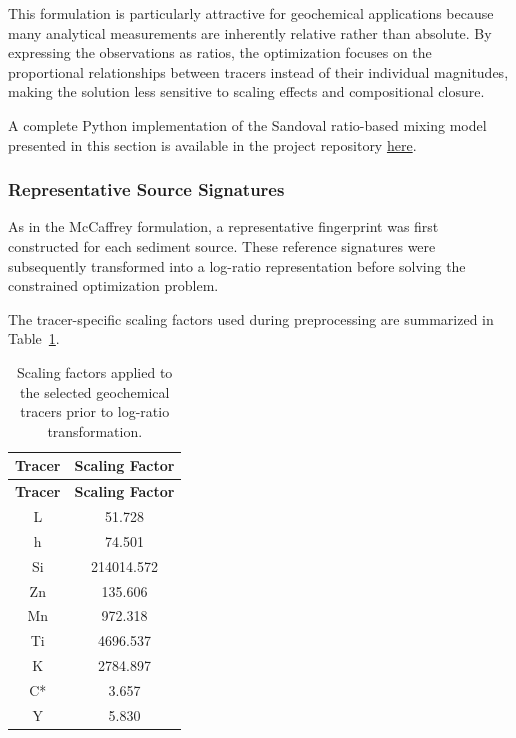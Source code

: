 \documentclass[
  12pt,
  letterpaper,
]{book}
\begin{document}
This formulation is particularly attractive for geochemical applications
because many analytical measurements are inherently relative rather than
absolute. By expressing the observations as ratios, the optimization
focuses on the proportional relationships between tracers instead of
their individual magnitudes, making the solution less sensitive to
scaling effects and compositional closure.

A complete Python implementation of the Sandoval ratio-based mixing
model presented in this section is available in the project repository
\href{https://github.com/rodrigokang/portfolio/tree/main/notebooks-and-scripts/5-climate-and-environmental-systems/1-sediment-source-modeling}{here}.

\subsubsection{Representative Source
Signatures}\label{representative-source-signatures-1}

As in the McCaffrey formulation, a representative fingerprint was first
constructed for each sediment source. These reference signatures were
subsequently transformed into a log-ratio representation before solving
the constrained optimization problem.

The tracer-specific scaling factors used during preprocessing are
summarized in Table~\ref{tbl-sandoval-scaling-factors}.

\begin{longtable}[]{@{}cc@{}}
\caption{Scaling factors applied to the selected geochemical tracers
prior to log-ratio
transformation.}\label{tbl-sandoval-scaling-factors}\tabularnewline
\toprule\noalign{}
\textbf{Tracer} & \textbf{Scaling Factor} \\
\midrule\noalign{}
\endfirsthead
\toprule\noalign{}
\textbf{Tracer} & \textbf{Scaling Factor} \\
\midrule\noalign{}
\endhead
\bottomrule\noalign{}
\endlastfoot
L & 51.728 \\
h & 74.501 \\
Si & 214014.572 \\
Zn & 135.606 \\
Mn & 972.318 \\
Ti & 4696.537 \\
K & 2784.897 \\
C* & 3.657 \\
Y & 5.830 \\
\end{longtable}
\end{document}
